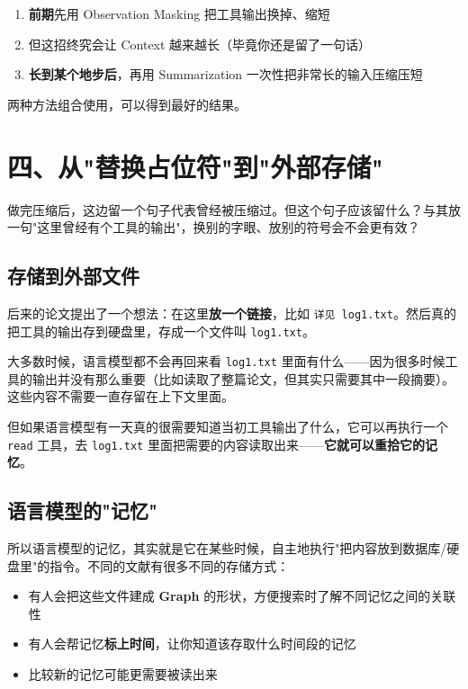 \documentclass[12pt,a4paper]{article}
\begin{document}
\begin{enumerate}[leftmargin=2em]
  \item \textbf{前期}先用 Observation Masking 把工具输出换掉、缩短
  \item 但这招终究会让 Context 越来越长（毕竟你还是留了一句话）
  \item \textbf{长到某个地步后}，再用 Summarization 一次性把非常长的输入压缩压短
\end{enumerate}

两种方法组合使用，可以得到最好的结果。

\section{四、从"替换占位符"到"外部存储"}

做完压缩后，这边留一个句子代表曾经被压缩过。但这个句子应该留什么？与其放一句"这里曾经有个工具的输出"，换别的字眼、放别的符号会不会更有效？

\subsection{存储到外部文件}

后来的论文提出了一个想法：在这里\textbf{放一个链接}，比如 \texttt{详见 log1.txt}。然后真的把工具的输出存到硬盘里，存成一个文件叫 \texttt{log1.txt}。

大多数时候，语言模型都不会再回来看 \texttt{log1.txt} 里面有什么——因为很多时候工具的输出并没有那么重要（比如读取了整篇论文，但其实只需要其中一段摘要）。这些内容不需要一直存留在上下文里面。

但如果语言模型有一天真的很需要知道当初工具输出了什么，它可以再执行一个 \texttt{read} 工具，去 \texttt{log1.txt} 里面把需要的内容读取出来——\textbf{它就可以重拾它的记忆}。

\subsection{语言模型的"记忆"}

所以语言模型的记忆，其实就是它在某些时候，自主地执行"把内容放到数据库/硬盘里"的指令。不同的文献有很多不同的存储方式：

\begin{itemize}[leftmargin=2em]
  \item 有人会把这些文件建成 \textbf{Graph} 的形状，方便搜索时了解不同记忆之间的关联性
  \item 有人会帮记忆\textbf{标上时间}，让你知道该存取什么时间段的记忆
  \item 比较新的记忆可能更需要被读出来
\end{itemize}
\end{document}

